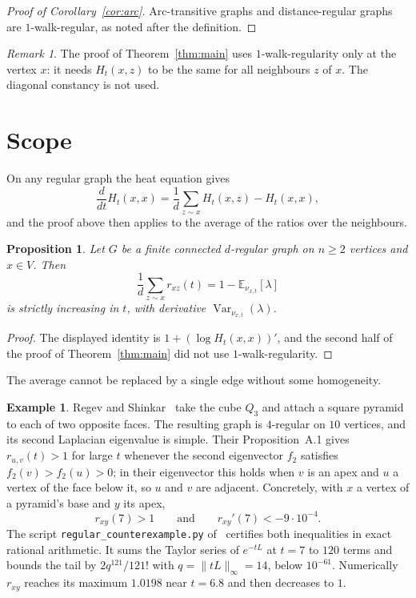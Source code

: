 \documentclass[11pt]{amsart}
\newtheorem{proposition}[theorem]{Proposition}
\theoremstyle{definition}
\newtheorem{example}[theorem]{Example}
\theoremstyle{remark}
\newtheorem{remark}[theorem]{Remark}
\DeclareMathOperator{\Var}{Var}
\newcommand{\E}{\mathbb{E}}
\begin{document}
\begin{proof}[Proof of Corollary~\ref{cor:arc}]
Arc-transitive graphs and distance-regular graphs are $1$-walk-regular, as noted after the definition.
\end{proof}

\begin{remark}
The proof of Theorem~\ref{thm:main} uses $1$-walk-regularity only at the vertex $x$: it needs $H_t(x,z)$ to be the same for all neighbours $z$ of $x$. The diagonal constancy is not used.
\end{remark}

\section{Scope}\label{sec:scope}

On any regular graph the heat equation gives
\[
\frac{d}{dt}H_t(x,x)=\frac1d\sum_{z\sim x}H_t(x,z)-H_t(x,x),
\]
and the proof above then applies to the average of the ratios over the neighbours.

\begin{proposition}\label{prop:average}
Let $G$ be a finite connected $d$-regular graph on $n\ge2$ vertices and $x\in V$. Then
\[
\frac1d\sum_{z\sim x}r_{xz}(t)=1-\E_{\nu_{x,t}}[\lambda]
\]
is strictly increasing in $t$, with derivative $\Var_{\nu_{x,t}}(\lambda)$.
\end{proposition}

\begin{proof}
The displayed identity is $1+(\log H_t(x,x))'$, and the second half of the proof of Theorem~\ref{thm:main} did not use $1$-walk-regularity.
\end{proof}

The average cannot be replaced by a single edge without some homogeneity.

\begin{example}\label{ex:regular}
Regev and Shinkar~\cite[Appendix~A]{RS} take the cube $Q_3$ and attach a square pyramid to each of two opposite faces. The resulting graph is $4$-regular on $10$ vertices, and its second Laplacian eigenvalue is simple. Their Proposition~A.1 gives $r_{u,v}(t)>1$ for large $t$ whenever the second eigenvector $f_2$ satisfies $f_2(v)>f_2(u)>0$; in their eigenvector this holds when $v$ is an apex and $u$ a vertex of the face below it, so $u$ and $v$ are adjacent. Concretely, with $x$ a vertex of a pyramid's base and $y$ its apex,
\[
r_{xy}(7)>1\qquad\text{and}\qquad r_{xy}'(7)<-9\cdot10^{-4} .
\]
The script \texttt{regular\_counterexample.py} of~\cite{code} certifies both inequalities in exact rational arithmetic. It sums the Taylor series of $e^{-tL}$ at $t=7$ to $120$ terms and bounds the tail by $2q^{121}/121!$ with $q=\|tL\|_\infty=14$, below $10^{-61}$. Numerically $r_{xy}$ reaches its maximum $1.0198$ near $t=6.8$ and then decreases to $1$.
\end{example}
\end{document}
